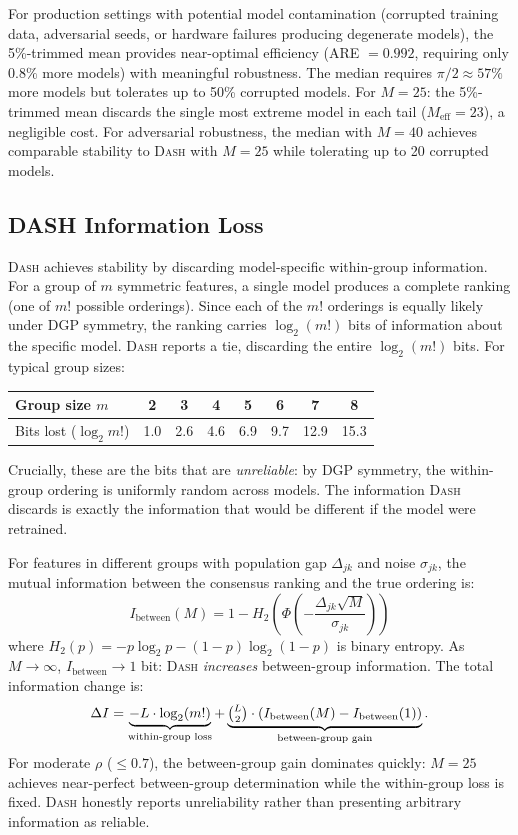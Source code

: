 \documentclass{article}
\newcommand{\DASH}{\textsc{Dash}}
\begin{document}
For production settings with potential model contamination (corrupted training data, adversarial seeds, or hardware failures producing degenerate models), the 5\%-trimmed mean provides near-optimal efficiency (ARE $= 0.992$, requiring only $0.8\%$ more models) with meaningful robustness. The median requires $\pi/2 \approx 57\%$ more models but tolerates up to 50\% corrupted models. For $M = 25$: the 5\%-trimmed mean discards the single most extreme model in each tail ($M_{\text{eff}} = 23$), a negligible cost. For adversarial robustness, the median with $M = 40$ achieves comparable stability to \DASH{} with $M = 25$ while tolerating up to 20 corrupted models.

\subsection{DASH Information Loss}
\label{sec:info-loss}

\DASH{} achieves stability by discarding model-specific within-group information. For a group of $m$ symmetric features, a single model produces a complete ranking (one of $m!$ possible orderings). Since each of the $m!$ orderings is equally likely under DGP symmetry, the ranking carries $\log_2(m!)$ bits of information about the specific model. \DASH{} reports a tie, discarding the entire $\log_2(m!)$ bits. For typical group sizes:

\begin{center}
\small
\begin{tabular}{@{}lccccccc@{}}
\toprule
Group size $m$ & 2 & 3 & 4 & 5 & 6 & 7 & 8 \\
\midrule
Bits lost ($\log_2 m!$) & 1.0 & 2.6 & 4.6 & 6.9 & 9.7 & 12.9 & 15.3 \\
\bottomrule
\end{tabular}
\end{center}

Crucially, these are the bits that are \emph{unreliable}: by DGP symmetry, the within-group ordering is uniformly random across models. The information \DASH{} discards is exactly the information that would be different if the model were retrained.

For features in different groups with population gap $\Delta_{jk}$ and noise $\sigma_{jk}$, the mutual information between the consensus ranking and the true ordering is:
\[
    I_{\text{between}}(M) = 1 - H_2\!\left(\Phi\!\left(-\frac{\Delta_{jk}\sqrt{M}}{\sigma_{jk}}\right)\right)
\]
where $H_2(p) = -p\log_2 p - (1-p)\log_2(1-p)$ is binary entropy. As $M \to \infty$, $I_{\text{between}} \to 1$ bit: \DASH{} \emph{increases} between-group information. The total information change is:
\[
    \Delta I = \underbrace{-L \cdot \log_2(m!)}_{\text{within-group loss}} + \underbrace{\tbinom{L}{2} \cdot (I_{\text{between}}(M) - I_{\text{between}}(1))}_{\text{between-group gain}}.
\]
For moderate $\rho$ ($\leq 0.7$), the between-group gain dominates quickly: $M = 25$ achieves near-perfect between-group determination while the within-group loss is fixed. \DASH{} honestly reports unreliability rather than presenting arbitrary information as reliable.
\end{document}
